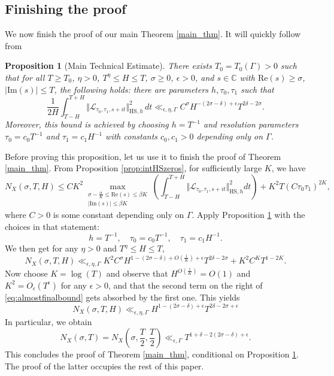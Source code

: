 \documentclass[12pt,letterpaper]{amsart}
\theoremstyle{plain}
\newtheorem{prop}{Proposition}[section]
\theoremstyle{definition}
\theoremstyle{remark}
\newcommand{\CC}{\mathbb{C}}
\begin{document}
\subsection{Finishing the proof}\label{sec:finish}
We now finish the proof of our main Theorem \ref{main_thm}. It will quickly follow from

\begin{prop}[Main Technical Estimate]\label{prop:main_estimate}
There exists $T_0 = T_0(\Gamma) > 0$ such that for all $T \ge T_0$, $\eta > 0$, $T^{\eta} \le H \le T$, $\sigma \ge 0$, $\epsilon > 0$, and $s \in \CC$ with $\mathrm{Re}(s) \ge \sigma$, $|\mathrm{Im}(s)| \le T$, the following holds: there are parameters $h, \tau_0, \tau_1$ such that
\[
\frac{1}{2H} \int_{T-H}^{T+H} \Vert \mathcal{L}_{\tau_0, \tau_1, s+it} \Vert_{\mathrm{HS}, h}^2 \, dt 
\ll_{\epsilon,\eta ,\Gamma} C^{\sigma} H^{-(2\sigma-\delta)+\epsilon} T^{2\delta - 2\sigma}.
\]
Moreover, this bound is achieved by choosing $h = T^{-1}$ and resolution parameters $\tau_0 = c_0 T^{-1}$ and $\tau_1 = c_1 H^{-1}$ with constants $c_0, c_1 > 0$ depending only on $\Gamma$.
\end{prop}


Before proving this proposition, let us use it to finish the proof of Theorem \ref{main_thm}. From Proposition \ref{prop:intHSzeros}, for sufficiently large $K$, we have
$$
N_X(\sigma, T, H) \le C K^2 \max_{\substack{ \sigma-\frac{\alpha}{K} \le  \mathrm{Re}(s)\le  \beta K \\ \vert \mathrm{Im}(s)\vert \le  \beta K }} \left( \int_{T-H}^{T+H} \Vert \mathcal{L}_{\tau_0, \tau_1, s+it} \Vert_{\mathrm{HS},h}^2 dt \right) +   K^2 T (C\tau_0 \tau_1)^{2K},
$$
where $C>0$ is some constant depending only on $\Gamma.$ Apply Proposition \ref{prop:main_estimate} with the choices in that statement:
\[
h = T^{-1}, \quad \tau_0 = c_0 T^{-1}, \quad \tau_1 = c_1 H^{-1}.
\]
We then get for any $\eta > 0$ and $T^{\eta} \le H \le T$,
\begin{equation}\label{eq:almostfinalbound}
N_X(\sigma, T, H) \ll_{\epsilon,\eta,\Gamma}  K^2 C^{\sigma} H^{1-(2\sigma-\delta)+ O(\frac{1}{K}) + \epsilon} T^{2\delta - 2\sigma} +  K^2 C^K T^{1-2K}.
\end{equation}
Now choose $K= \log(T)$ and observe that $H^{O(\frac{1}{K})} = O(1)$ and $K^2 = O_\epsilon (T^\epsilon) $ for any $\epsilon>0$, and that the second term on the right of \eqref{eq:almostfinalbound} gets absorbed by the first one. This yields
$$
N_X(\sigma, T, H) \ll_{\epsilon,\eta,\Gamma} H^{1-(2\sigma-\delta)+\epsilon} T^{2\delta - 2\sigma + \epsilon} 
$$
In particular, we obtain
$$
N_X(\sigma,T) = N_X\left(\sigma,\frac{T}{2}, \frac{T}{2}\right) \ll_{\epsilon,\Gamma} T^{1+\delta - 2(2\sigma - \delta)+\epsilon}.
$$
This concludes the proof of Theorem \ref{main_thm}, conditional on Proposition \ref{prop:main_estimate}. The proof of the latter occupies the rest of this paper.
\end{document}
